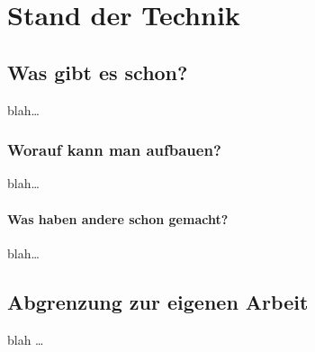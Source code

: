 \chapter{Stand der Technik}


\section{Was gibt es schon?}
blah\dots

\subsection{Worauf kann man aufbauen?}
blah\dots

\subsubsection{Was haben andere schon gemacht?}
blah\dots


\section{Abgrenzung zur eigenen Arbeit}
blah \dots





